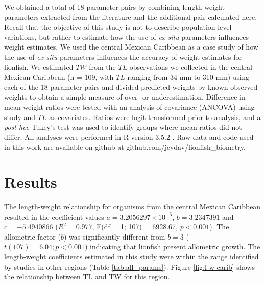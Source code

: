 \documentclass[fleqn,10pt,lineno]{wlpeerj} %
\begin{document}
We obtained a total of 18 parameter pairs by combining length-weight
parameters extracted from the literature and the additional pair
calculated here. Recall that the objective of this study is not to
describe population-level variations, but rather to estimate how the use
of \emph{ex situ} parameters influences weight estimates. We used the
central Mexican Caribbean as a case study of how the use of \emph{ex
situ} parameters influences the accuracy of weight estimates for
lionfish. We estimated \(TW\) from the \(TL\) observations we collected
in the central Mexican Caribbean (n = 109, with \(TL\) ranging from 34
mm to 310 mm) using each of the 18 parameter pairs and divided predicted
weights by known observed weights to obtain a simple measure of over- or
underestimation. Difference in mean weight ratios were tested with an
analysis of covariance (ANCOVA) using study and \(TL\) as covariates.
Ratios were logit-transformed prior to analysis, and a \emph{post-hoc}
Tukey's test was used to identify groups where mean ratios did not
differ. All analyses were performed in R version 3.5.2
\citep{rcore_2018}. Raw data and code used in this work are available on
github at github.com/jcvdav/lionfish\_biometry.

\section*{Results}

The length-weight relationship for organisms from the central Mexican
Caribbean resulted in the coefficient values
\(a = 3.2056297\times 10^{-6}\), \(b = 3.2347391\) and
\(c = -5.4940866\) (\(R^2 = 0.977\), F(df = 1; 107) = 6928.67,
\(p < 0.001\)). The allometric factor (\(b\)) was significantly
different from \(b = 3\) (\(t(107) = 6.04; p<0.001\)) indicating that
lionfish present allometric growth. The length-weight coefficients
estimated in this study were within the range identified by studies in
other regions (Table \ref{tab:all_params}). Figure \ref{fig:l-w-carib}
shows the relationship between TL and TW for this region.
\end{document}
